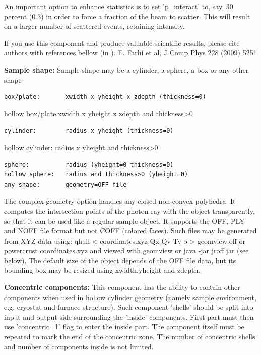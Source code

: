 An important option to enhance statistics is to set 'p\_interact' to, say, 30 percent (0.3) in order to force a fraction of the beam to scatter. This will result on a larger number of scattered events, retaining intensity.

If you use this component and produce valuable scientific results, please cite authors with references bellow (in ). E. Farhi et al, J Comp Phys 228 (2009) 5251

\textbf{Sample shape:} Sample shape may be a cylinder, a sphere, a box or any other shape

\begin{verbatim}
box/plate:       xwidth x yheight x zdepth (thickness=0)
\end{verbatim}

hollow box/plate:xwidth x yheight x zdepth and thickness\textgreater{}0

\begin{verbatim}
cylinder:        radius x yheight (thickness=0)
\end{verbatim}

hollow cylinder: radius x yheight and thickness\textgreater{}0

\begin{verbatim}
sphere:          radius (yheight=0 thickness=0)
hollow sphere:   radius and thickness>0 (yheight=0)
any shape:       geometry=OFF file
\end{verbatim}

The complex geometry option handles any closed non-convex polyhedra. It computes the intersection points of the photon ray with the object transparently, so that it can be used like a regular sample object. It supports the OFF, PLY and NOFF file format but not COFF (colored faces). Such files may be generated from XYZ data using: qhull \textless{} coordinates.xyz Qx Qv Tv o \textgreater{} geomview.off or powercrust coordinates.xyz and viewed with geomview or java -jar jroff.jar (see below). The default size of the object depends of the OFF file data, but its bounding box may be resized using xwidth,yheight and zdepth.

\textbf{Concentric components:} This component has the ability to contain other components when used in hollow cylinder geometry (namely sample environment, e.g. cryostat and furnace structure). Such component 'shells' should be split into input and output side surrounding the 'inside' components. First part must then use 'concentric=1' flag to enter the inside part. The component itself must be repeated to mark the end of the concentric zone. The number of concentric shells and number of components inside is not limited.

